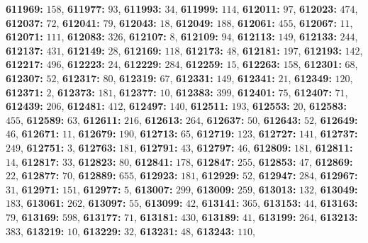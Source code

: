 \textsf{\bfseries 611969:} $158$, \textsf{\bfseries 611977:} $93$, \textsf{\bfseries 611993:} $34$, \textsf{\bfseries 611999:} $114$, \textsf{\bfseries 612011:} $97$, \textsf{\bfseries 612023:} $474$, \textsf{\bfseries 612037:} $72$, \textsf{\bfseries 612041:} $79$, \textsf{\bfseries 612043:} $18$, \textsf{\bfseries 612049:} $188$, \textsf{\bfseries 612061:} $455$, \textsf{\bfseries 612067:} $11$, \textsf{\bfseries 612071:} $111$, \textsf{\bfseries 612083:} $326$, \textsf{\bfseries 612107:} $8$, \textsf{\bfseries 612109:} $94$, \textsf{\bfseries 612113:} $149$, \textsf{\bfseries 612133:} $244$, \textsf{\bfseries 612137:} $431$, \textsf{\bfseries 612149:} $28$, \textsf{\bfseries 612169:} $118$, \textsf{\bfseries 612173:} $48$, \textsf{\bfseries 612181:} $197$, \textsf{\bfseries 612193:} $142$, \textsf{\bfseries 612217:} $496$, \textsf{\bfseries 612223:} $24$, \textsf{\bfseries 612229:} $284$, \textsf{\bfseries 612259:} $15$, \textsf{\bfseries 612263:} $158$, \textsf{\bfseries 612301:} $68$, \textsf{\bfseries 612307:} $52$, \textsf{\bfseries 612317:} $80$, \textsf{\bfseries 612319:} $67$, \textsf{\bfseries 612331:} $149$, \textsf{\bfseries 612341:} $21$, \textsf{\bfseries 612349:} $120$, \textsf{\bfseries 612371:} $2$, \textsf{\bfseries 612373:} $181$, \textsf{\bfseries 612377:} $10$, \textsf{\bfseries 612383:} $399$, \textsf{\bfseries 612401:} $75$, \textsf{\bfseries 612407:} $71$, \textsf{\bfseries 612439:} $206$, \textsf{\bfseries 612481:} $412$, \textsf{\bfseries 612497:} $140$, \textsf{\bfseries 612511:} $193$, \textsf{\bfseries 612553:} $20$, \textsf{\bfseries 612583:} $455$, \textsf{\bfseries 612589:} $63$, \textsf{\bfseries 612611:} $216$, \textsf{\bfseries 612613:} $264$, \textsf{\bfseries 612637:} $50$, \textsf{\bfseries 612643:} $52$, \textsf{\bfseries 612649:} $46$, \textsf{\bfseries 612671:} $11$, \textsf{\bfseries 612679:} $190$, \textsf{\bfseries 612713:} $65$, \textsf{\bfseries 612719:} $123$, \textsf{\bfseries 612727:} $141$, \textsf{\bfseries 612737:} $249$, \textsf{\bfseries 612751:} $3$, \textsf{\bfseries 612763:} $181$, \textsf{\bfseries 612791:} $43$, \textsf{\bfseries 612797:} $46$, \textsf{\bfseries 612809:} $181$, \textsf{\bfseries 612811:} $14$, \textsf{\bfseries 612817:} $33$, \textsf{\bfseries 612823:} $80$, \textsf{\bfseries 612841:} $178$, \textsf{\bfseries 612847:} $255$, \textsf{\bfseries 612853:} $47$, \textsf{\bfseries 612869:} $22$, \textsf{\bfseries 612877:} $70$, \textsf{\bfseries 612889:} $655$, \textsf{\bfseries 612923:} $181$, \textsf{\bfseries 612929:} $52$, \textsf{\bfseries 612947:} $284$, \textsf{\bfseries 612967:} $31$, \textsf{\bfseries 612971:} $151$, \textsf{\bfseries 612977:} $5$, \textsf{\bfseries 613007:} $299$, \textsf{\bfseries 613009:} $259$, \textsf{\bfseries 613013:} $132$, \textsf{\bfseries 613049:} $183$, \textsf{\bfseries 613061:} $262$, \textsf{\bfseries 613097:} $55$, \textsf{\bfseries 613099:} $42$, \textsf{\bfseries 613141:} $365$, \textsf{\bfseries 613153:} $44$, \textsf{\bfseries 613163:} $79$, \textsf{\bfseries 613169:} $598$, \textsf{\bfseries 613177:} $71$, \textsf{\bfseries 613181:} $430$, \textsf{\bfseries 613189:} $41$, \textsf{\bfseries 613199:} $264$, \textsf{\bfseries 613213:} $383$, \textsf{\bfseries 613219:} $10$, \textsf{\bfseries 613229:} $32$, \textsf{\bfseries 613231:} $48$, \textsf{\bfseries 613243:} $110$, 

